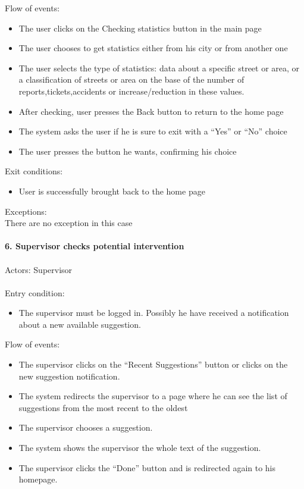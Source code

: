 \documentclass[a4paper]{report}
\begin{document}
Flow of events:
\begin{itemize}
\item The user clicks on the Checking statistics button in the main page
\item The user chooses to get statistics either from his city or from another one
\item The user selects the type of statistics: data about a specific street or area, or a classification of streets or area on the base of the number of reports,tickets,accidents or increase/reduction in these values.
\item After checking, user presses the Back button to return to the home page
\item The system asks the user if he is sure to exit with a “Yes” or “No” choice
\item The user presses the button he wants, confirming his choice
\end{itemize}
Exit conditions:
\begin{itemize}
\item User is successfully brought back to the home page
\end{itemize}
Exceptions: \\There are no exception in this case
\\ \\
\textbf{6. Supervisor checks potential intervention}\label{uc:6}
\\ \\
Actors: Supervisor \\ \\
Entry condition: 
\begin{itemize}
\item The supervisor must be logged in. Possibly he have received a notification about a new available suggestion. 
\end{itemize}
Flow of events:
\begin{itemize}
\item The supervisor clicks on the “Recent Suggestions” button or clicks on the new suggestion notification.
\item The system redirects the supervisor to a page where he can see the list of suggestions from the most recent to the oldest
\item The supervisor chooses a suggestion.
\item The system shows the supervisor the whole text of the suggestion.
\item The supervisor clicks the “Done” button and is redirected again to his homepage.
\end{itemize}
\end{document}
